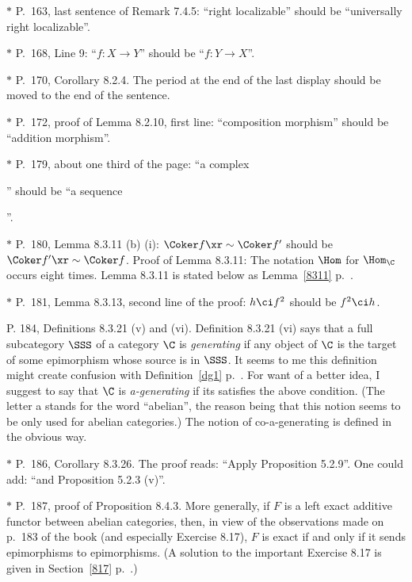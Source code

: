 \documentclass[12pt]{article}
\theoremstyle{remark}
\theoremstyle{definition}
\begin{document}
%

\nn$*$ P.~163, last sentence of Remark 7.4.5: ``right localizable'' should be ``universally right localizable''.

\nn$*$ P.~168, Line 9: ``$f:X\to Y$'' should be ``$f:Y\to X$''.

\nn$*$ P.~170, Corollary 8.2.4. The period at the end of the last display should be moved to the end of the sentence.

\nn$*$ P.~172, proof of Lemma 8.2.10, first line: ``composition morphism'' should be ``addition morphism''.

\nn$*$ P.~179, about one third of the page: ``a complex 
'' 
should be ``a sequence 
''.

\nn$*$ P.~180, Lemma 8.3.11 (b) (i): $\Coker f\xr\sim\Coker f'$ should be $\Coker f'\xr\sim\Coker f$. Proof of Lemma 8.3.11: The notation $\Hom$ for $\Hom_\C$ occurs eight times. Lemma 8.3.11 is stated below as Lemma~\ref{8311} p.~. 

\nn$*$ P.~181, Lemma 8.3.13, second line of the proof: $h\ci f^2$ should be $f^2\ci h$. 

\begin{s} 
P. 184, Definitions 8.3.21 (v) and (vi). Definition 8.3.21 (vi) says that a full subcategory $\SSS$ of a category $\C$ is \emph{generating} if any object of $\C$ is the target of some epimorphism whose source is in $\SSS$. It seems to me this definition might create confusion with Definition~\ref{dg1} p.~. For want of a better idea, I suggest to say that $\C$ is \emph{a-generating} if its satisfies the above condition. (The letter a stands for the word ``abelian'', the reason being that this notion seems to be only used for abelian categories.) The notion of co-a-generating is defined in the obvious way.
\end{s} 

\nn$*$ P.~186, Corollary 8.3.26. The proof reads: ``Apply Proposition 5.2.9''. One could add: ``and Proposition 5.2.3 (v)''.

\nn$*$ P.~187, proof of Proposition 8.4.3. More generally, if $F$ is a left exact additive functor between abelian categories, then, in view of the observations made on p.~183 of the book (and especially Exercise 8.17), $F$ is exact if and only if it sends epimorphisms to epimorphisms. (A solution to the important Exercise 8.17 is given in Section~\ref{817} p.~.)
\end{document}

